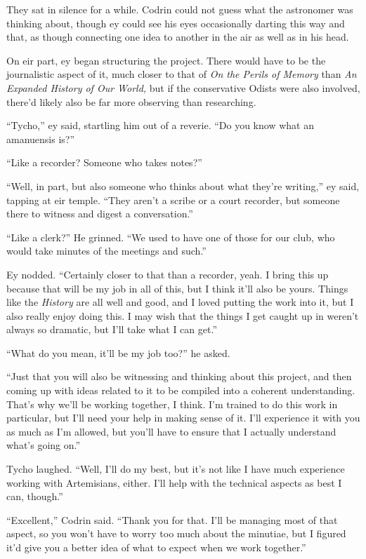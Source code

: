 They sat in silence for a while. Codrin could not guess what the astronomer was thinking about, though ey could see his eyes occasionally darting this way and that, as though connecting one idea to another in the air as well as in his head.

On eir part, ey began structuring the project. There would have to be the journalistic aspect of it, much closer to that of \emph{On the Perils of Memory} than \emph{An Expanded History of Our World,} but if the conservative Odists were also involved, there'd likely also be far more observing than researching.

``Tycho,'' ey said, startling him out of a reverie. ``Do you know what an amanuensis is?''

``Like a recorder? Someone who takes notes?''

``Well, in part, but also someone who thinks about what they're writing,'' ey said, tapping at eir temple. ``They aren't a scribe or a court recorder, but someone there to witness and digest a conversation.''

``Like a clerk?'' He grinned. ``We used to have one of those for our club, who would take minutes of the meetings and such.''

Ey nodded. ``Certainly closer to that than a recorder, yeah. I bring this up because that will be my job in all of this, but I think it'll also be yours. Things like the \emph{History} are all well and good, and I loved putting the work into it, but I also really enjoy doing this. I may wish that the things I get caught up in weren't always so dramatic, but I'll take what I can get.''

``What do you mean, it'll be my job too?'' he asked.

``Just that you will also be witnessing and thinking about this project, and then coming up with ideas related to it to be compiled into a coherent understanding. That's why we'll be working together, I think. I'm trained to do this work in particular, but I'll need your help in making sense of it. I'll experience it with you as much as I'm allowed, but you'll have to ensure that I actually understand what's going on.''

Tycho laughed. ``Well, I'll do my best, but it's not like I have much experience working with Artemisians, either. I'll help with the technical aspects as best I can, though.''

``Excellent,'' Codrin said. ``Thank you for that. I'll be managing most of that aspect, so you won't have to worry too much about the minutiae, but I figured it'd give you a better idea of what to expect when we work together.''

